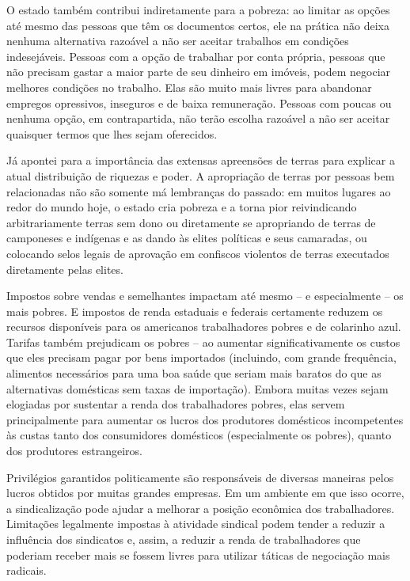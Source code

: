O estado também contribui indiretamente para a pobreza: ao limitar as opções até mesmo das pessoas que têm os documentos certos, ele na prática não deixa nenhuma alternativa razoável a não ser aceitar trabalhos em condições indesejáveis. Pessoas com a opção de trabalhar por conta própria, pessoas que não precisam gastar a maior parte de seu dinheiro em imóveis, podem negociar melhores condições no trabalho. Elas são muito mais livres para abandonar empregos opressivos, inseguros e de baixa remuneração. Pessoas com poucas ou nenhuma opção, em contrapartida, não terão escolha razoável a não ser aceitar quaisquer termos que lhes sejam oferecidos.

Já apontei para a importância das extensas apreensões de terras para explicar a atual distribuição de riquezas e poder. A apropriação de terras por pessoas bem relacionadas não são somente má lembranças do passado: em muitos lugares ao redor do mundo hoje, o estado cria pobreza e a torna pior reivindicando arbitrariamente terras sem dono ou diretamente se apropriando de terras de camponeses e indígenas e as dando às elites políticas e seus camaradas, ou colocando selos legais de aprovação em confiscos violentos de terras executados diretamente pelas elites.

Impostos sobre vendas e semelhantes impactam até mesmo -- e especialmente -- os mais pobres. E impostos de renda estaduais e federais certamente reduzem os recursos disponíveis para os americanos trabalhadores pobres e de colarinho azul. Tarifas também prejudicam os pobres -- ao aumentar significativamente os custos que eles precisam pagar por bens importados (incluindo, com grande frequência, alimentos necessários para uma boa saúde que seriam mais baratos do que as alternativas domésticas sem taxas de importação). Embora muitas vezes sejam elogiadas por sustentar a renda dos trabalhadores pobres, elas servem principalmente para aumentar os lucros dos produtores domésticos incompetentes às custas tanto dos consumidores domésticos (especialmente os pobres), quanto dos produtores estrangeiros.

Privilégios garantidos politicamente são responsáveis de diversas maneiras pelos lucros obtidos por muitas grandes empresas. Em um ambiente em que isso ocorre, a sindicalização pode ajudar a melhorar a posição econômica dos trabalhadores. Limitações legalmente impostas à atividade sindical podem tender a reduzir a influência dos sindicatos e, assim, a reduzir a renda de trabalhadores que poderiam receber mais se fossem livres para utilizar táticas de negociação mais radicais.

